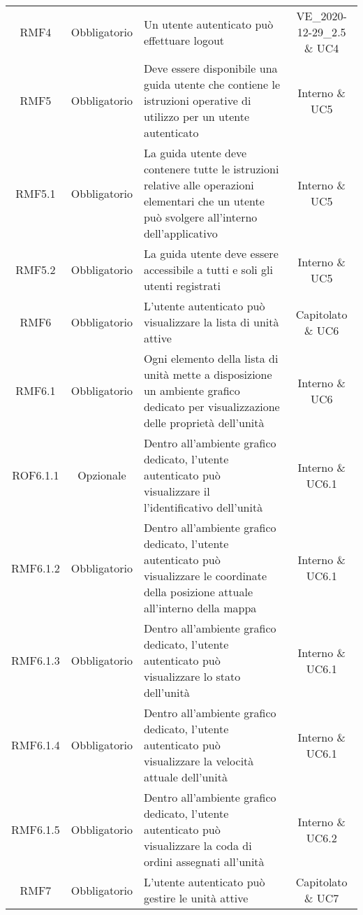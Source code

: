 \begin{longtable}[h!] { c c m{8cm} c}
		RMF4 & Obbligatorio & Un utente autenticato può effettuare logout & VE\_2020-12-29\_2.5 \& UC4 \\

		RMF5 & Obbligatorio & Deve essere disponibile una guida utente che contiene le istruzioni operative di utilizzo per un utente autenticato & Interno \& UC5 \\

		RMF5.1 & Obbligatorio & La guida utente deve contenere tutte le istruzioni relative alle operazioni elementari che un utente può svolgere all'interno dell'applicativo & Interno \& UC5 \\

		RMF5.2 & Obbligatorio & La guida utente deve essere accessibile a tutti e soli gli utenti registrati & Interno \& UC5 \\

		RMF6 & Obbligatorio & L'utente autenticato può visualizzare la lista di unità attive & Capitolato \& UC6 \\

		RMF6.1 & Obbligatorio & Ogni elemento della lista di unità mette a disposizione un ambiente grafico dedicato per visualizzazione delle proprietà dell'unità & Interno \& UC6 \\

		ROF6.1.1 & Opzionale & Dentro all'ambiente grafico dedicato, l'utente autenticato può visualizzare il l'identificativo dell'unità & Interno \& UC6.1 \\

		RMF6.1.2 & Obbligatorio & Dentro all'ambiente grafico dedicato, l'utente autenticato può visualizzare le coordinate della posizione attuale all'interno della mappa & Interno \& UC6.1 \\

		RMF6.1.3 & Obbligatorio &  Dentro all'ambiente grafico dedicato, l'utente autenticato può visualizzare lo stato dell'unità & Interno \& UC6.1 \\

		RMF6.1.4 & Obbligatorio &  Dentro all'ambiente grafico dedicato, l'utente autenticato può visualizzare la velocità attuale dell'unità & Interno \& UC6.1 \\

		RMF6.1.5 & Obbligatorio &  Dentro all'ambiente grafico dedicato, l'utente autenticato può visualizzare la coda di ordini assegnati all'unità & Interno \& UC6.2 \\

		RMF7 & Obbligatorio & L'utente autenticato può gestire le unità attive & Capitolato \& UC7 \\


\end{longtable}
